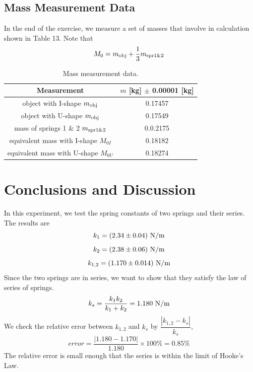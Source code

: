 \documentclass[a4paper]{report}
\begin{document}
	\subsection{Mass Measurement Data}
	In the end of the exercise, we measure a set of masses that involve in calculation shown in Table 13. Note that
	\begin{equation*}
	M_0=m_{\rm{obj}}+\dfrac{1}{3}m_{\rm{spr1\&2}}
	\end{equation*}
	\begin{table}[H]
		\centering
		\begin{tabular}{|c|c|}
			\hline
			Measurement&$m$ [kg] $\pm$ 0.00001 [kg]\\
			\hline
			object with I-shape $m_{\rm{obj}}$&0.17457\\
			\hline
			object with U-shape $m_{\rm{obj}}$&0.17549\\
			\hline
			mass of springs 1 \& 2 $m_{\rm{spr1\&2}}$&0.0.2175\\
			\hline
			equivalent mass with I-shape $M_{0I}$&0.18182\\
			\hline
			equivalent mass with U-shape $M_{0U}$&0.18274\\
			\hline
		\end{tabular}
	\caption{Mass measurement data.}
	\end{table}
	\section{Conclusions and Discussion}
	In this experiment, we test the spring constants of two springs and their series. The results are
	\begin{equation*}
	k_1=(2.34\pm0.04)\ \rm{N/m}
	\end{equation*}
	\begin{equation*}
	k_2=(2.38\pm0.06)\ \rm{N/m}
	\end{equation*}
	\begin{equation*}
	k_{1,2}=(1.170\pm0.014)\ \rm{N/m}
	\end{equation*}
	Since the two springs are in series, we want to show that they satisfy the law of series of springs.
	\begin{equation*}
	k_s=\dfrac{k_1k_2}{k_1+k_2}=1.180\ \rm{N/m}
	\end{equation*}
	We check the relative error between $k_{1,2}$ and $k_s$ by $\dfrac{|k_{1,2}-k_s|}{k_s}$,
	\begin{equation*}
	error=\dfrac{\left|1.180-1.170\right|}{1.180}\times100\%=0.85\%
	\end{equation*}
	The relative error is small enough that the series is within the limit of Hooke's Law.
	
\end{document}
